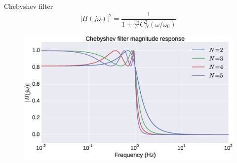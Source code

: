 \documentclass{beamer}
\begin{document}
\begin{frame}{Chebyshev filter}
\[ \left|H(j\omega)\right|^2 = \frac{1}{1+\gamma^2C_N^2(\omega/\omega_0)} \]

\begin{figure}
\centering
\includegraphics[width=\textwidth]{img/cheby.eps}
\end{figure}
\end{frame}
\end{document}
